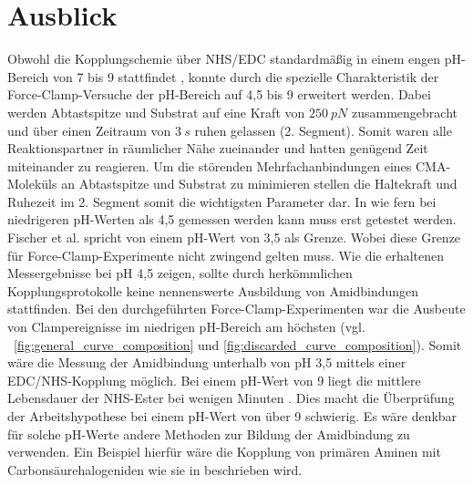 \chapter{Ausblick}
\label{kap:ausblick}

Obwohl die Kopplungschemie über \ac{NHS}/\ac{EDC} standardmäßig in einem engen pH-Bereich von 7 bis 9 stattfindet \cite{Hayworth,Fischer.2010,Nojima.2009}, konnte durch die spezielle Charakteristik der Force-Clamp-Versuche der pH-Bereich auf 4,5 bis 9 erweitert werden. Dabei werden Abtastspitze und Substrat auf eine Kraft von $250~pN$ zusammengebracht und über einen Zeitraum von $3~s$ ruhen gelassen (2. Segment). Somit waren alle Reaktionspartner in räumlicher Nähe zueinander und hatten genügend Zeit miteinander zu reagieren. Um die störenden Mehrfachanbindungen eines CMA-Moleküls an Abtastspitze und Substrat zu minimieren stellen die Haltekraft und Ruhezeit im 2. Segment somit die wichtigsten Parameter dar. In wie fern bei niedrigeren pH-Werten als 4,5 gemessen werden kann muss erst getestet werden. Fischer et al. \cite{Fischer.2010} spricht von einem pH-Wert von 3,5 als Grenze. Wobei diese Grenze für Force-Clamp-Experimente nicht zwingend gelten muss. Wie die erhaltenen Messergebnisse bei pH 4,5 zeigen, sollte durch herkömmlichen Kopplungsprotokolle keine nennenswerte Ausbildung von Amidbindungen stattfinden. Bei den durchgeführten Force-Clamp-Experimenten war die Ausbeute von Clampereignisse im niedrigen pH-Bereich am höchsten (vgl. \abb~\ref{fig:general_curve_composition} und \ref{fig:discarded_curve_composition}). Somit wäre die Messung der Amidbindung unterhalb von pH 3,5 mittels einer \ac{EDC}/\ac{NHS}-Kopplung möglich. Bei einem pH-Wert von 9 liegt die mittlere Lebensdauer der NHS-Ester bei wenigen Minuten \cite{Hayworth}. Dies macht die Überprüfung der Arbeitshypothese bei einem pH-Wert von über 9 schwierig. Es wäre denkbar für solche pH-Werte andere Methoden zur Bildung der Amidbindung zu verwenden. Ein Beispiel hierfür wäre die Kopplung von primären Aminen mit Carbonsäurehalogeniden wie sie in \cite{Montalbetti.2005} beschrieben wird.